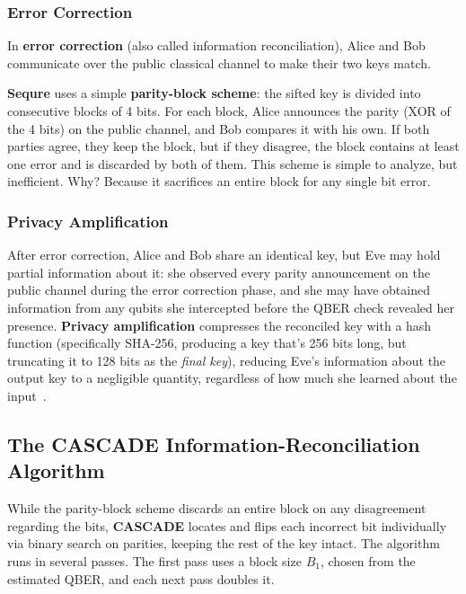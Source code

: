 \documentclass[12pt, a4paper]{article}
\begin{document}
\subsubsection{Error Correction}

In \textbf{error correction} (also called information reconciliation), Alice and Bob communicate over the public classical channel to make their two keys match.  

\textbf{Sequre} uses a simple \textbf{parity-block scheme}: the sifted key 
is divided into consecutive blocks of 4 bits. For each block, Alice announces the parity (XOR of the 4 bits) on the public channel, and Bob compares it with his own. If both parties agree, they keep the block, but if they disagree, the block contains at least one error and is discarded by both of them. This scheme is simple to analyze, but inefficient. Why? Because it sacrifices an entire block for any single bit error. 

\subsubsection{Privacy Amplification}

After error correction, Alice and Bob share an identical key, but Eve may hold partial information about it: she observed every parity announcement on the public channel during the error correction phase, and she may have obtained information from any qubits she intercepted before the QBER check revealed her presence. 
\textbf{Privacy amplification} compresses the reconciled key with a hash function (specifically SHA-256, producing a key that's 256 bits long, but truncating it to 128 bits as the \textit{final key}), reducing Eve's information about the output key to a negligible quantity, regardless of how much she learned about the input~\cite{bennett1995pa}.


\subsection{The CASCADE Information-Reconciliation Algorithm}
\label{sec:cascade}

While the parity-block scheme discards an entire block on any disagreement regarding the bits, \textbf{CASCADE} locates and flips each incorrect bit individually via binary search on parities, keeping the rest of the key intact. 
The algorithm runs in several passes. The first pass uses a block size $B_1$, chosen from the estimated QBER, and each next pass doubles it. 
\end{document}
